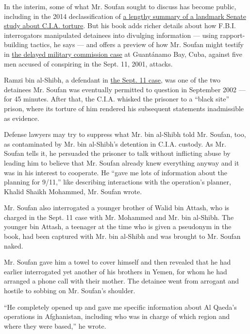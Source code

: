 In the interim, some of what Mr. Soufan sought to discuss has become
public, including in the 2014 declassification of
\href{https://www.nytimes3xbfgragh.onion/interactive/2014/12/09/world/cia-torture-report-document.html}{a
lengthy summary of a landmark Senate study about C.I.A. torture}. But
his book adds richer details about how F.B.I. interrogators manipulated
detainees into divulging information --- using rapport-building tactics,
he says --- and offers a preview of how Mr. Soufan might testify in
\href{https://www.nytimes3xbfgragh.onion/2020/04/17/us/politics/911-trial-guantanamo.html}{the
delayed military commission case} at Guantánamo Bay, Cuba, against five
men accused of conspiring in the Sept. 11, 2001, attacks.

Ramzi bin al-Shibh, a defendant in
\href{https://www.nytimes3xbfgragh.onion/2020/02/03/us/politics/september-11-trial-guantanamo-bay.html}{the
Sept. 11 case}, was one of the two detainees Mr. Soufan was eventually
permitted to question in September 2002 --- for 45 minutes. After that,
the C.I.A. whisked the prisoner to a ``black site'' prison, where its
torture of him rendered his subsequent statements inadmissible as
evidence.

Defense lawyers may try to suppress what Mr. bin al-Shibh told Mr.
Soufan, too, as contaminated by Mr. bin al-Shibh's detention in C.I.A.
custody. As Mr. Soufan tells it, he persuaded the prisoner to talk
without inflicting abuse by leading him to believe that Mr. Soufan
already knew everything anyway and it was in his interest to cooperate.
He ``gave me lots of information about the planning for 9/11,'' like
describing interactions with the operation's planner, Khalid Shaikh
Mohammed, Mr. Soufan wrote.

Mr. Soufan also interrogated a younger brother of Walid bin Attash, who
is charged in the Sept. 11 case with Mr. Mohammed and Mr. bin al-Shibh.
The younger bin Attash, a teenager at the time who is given a pseudonym
in the book, had been captured with Mr. bin al-Shibh and was brought to
Mr. Soufan naked.

Mr. Soufan gave him a towel to cover himself and then revealed that he
had earlier interrogated yet another of his brothers in Yemen, for whom
he had arranged a phone call with their mother. The detainee went from
arrogant and hostile to sobbing on Mr. Soufan's shoulder.

``He completely opened up and gave me specific information about Al
Qaeda's operations in Afghanistan, including who was in charge of which
region and where they were based,'' he wrote.

